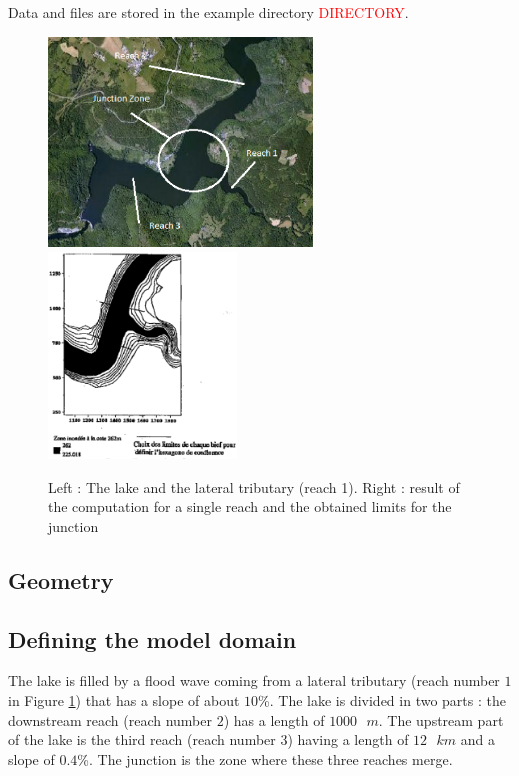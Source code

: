 \documentclass[a4paper,12pt]{article}
\begin{document}
\vspace{0.5cm}

Data and files are stored in the example directory \textcolor{red}{DIRECTORY}.

\begin{figure}[h]
  \begin{center}
  \includegraphics[clip,width=7cm]{barrage}\includegraphics[width=5cm]{confluent_hexa}\caption{\label{fig:The-dam-lake}Left : The lake and the lateral tributary
  (reach 1). Right : result of the computation for a single reach and
  the obtained limits for the junction}
  \end{center}
\end{figure}



\subsection{Geometry}


\subsection{Defining the model domain}

\hspace{0.5cm} The lake is filled by a flood wave coming from a lateral tributary
(reach number $1$ in Figure \ref{fig:The-dam-lake}) that has a slope
of about $10$\%. The lake is divided in two parts : the downstream reach
(reach number $2$) has a length of $1000\mbox{ }m$. The upstream part of the lake is the third reach (reach number $3$)
having a length of $12\mbox{ }km$ and a slope of $0.4$\%. The junction is the
zone where these three reaches merge.
\end{document}
